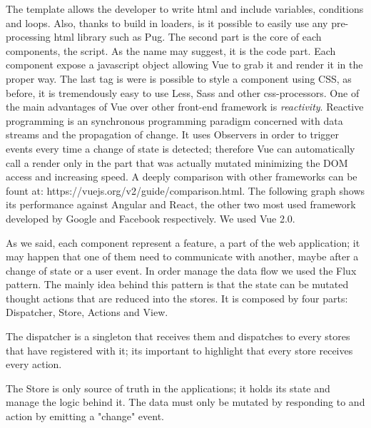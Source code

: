 \documentclass[]{usiinfbachelorproject}
\begin{document}
The template allows the developer to write html and include variables, conditions and loops. Also, thanks to build in loaders, is it possible to easily use any pre-processing html library such as Pug.
The second part is the core of each components, the script. As the name may suggest, it is the code part. Each component expose a javascript object allowing Vue to grab it and render it in the proper way.
The last tag is were is possible to style a component using CSS, as before, it is tremendously easy to use Less, Sass and other css-processors.
One of the main advantages of Vue over other front-end framework is \emph{reactivity}. Reactive programming is an synchronous programming paradigm concerned with data streams and the propagation of change. It uses Observers in order to trigger events every time a change of state is detected; therefore Vue can automatically call a render only in the part that was actually mutated minimizing the DOM access and increasing speed.
A deeply comparison with other frameworks can be fount at: https://vuejs.org/v2/guide/comparison.html. The following graph shows its performance against Angular and React, the other two most used framework developed by Google and Facebook respectively. We used Vue 2.0.
\begin{figure}[H]
  \centering
\end{figure} 
As we said, each component represent a feature, a part of the web application; it may happen that one of them need to communicate with another, maybe after a change of state or a user event. In order manage the data flow we used the Flux pattern. The mainly idea behind this pattern is that the state can be mutated thought actions that are reduced into the stores. It is composed by four parts: Dispatcher, Store, Actions and View.

The dispatcher is a singleton that receives them and dispatches to every stores that have registered with it; its important to highlight that every store receives every action.

The Store is only source of truth in the applications; it holds its state and manage the logic behind it. The data must only be mutated by responding to and action by emitting a "change" event.
\end{document}
